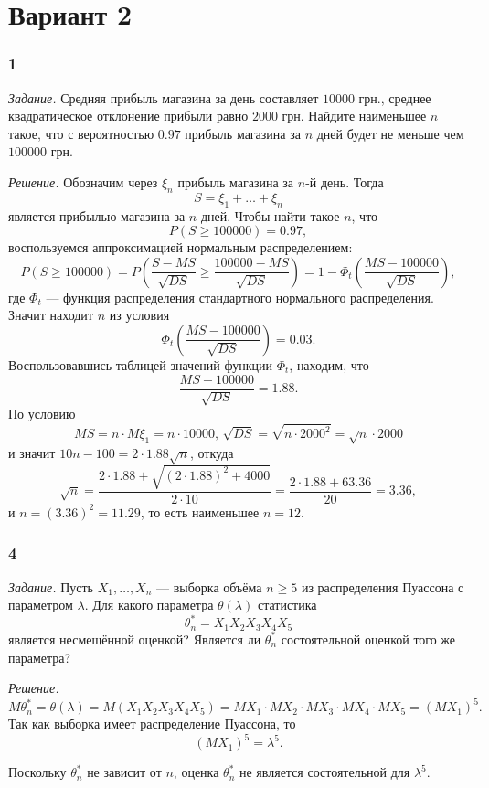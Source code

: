 \section*{Вариант 2}

\subsubsection*{1}

\textit{Задание.}
Средняя прибыль магазина за день составляет $10000$ грн.,
среднее квадратическое отклонение прибыли равно $2000$ грн.
Найдите наименьшее $n$ такое,
что с вероятностью $0.97$ прибыль магазина за $n$ дней будет не меньше чем $100000$ грн.

\textit{Решение.} Обозначим через $ \xi_n$ прибыль магазина за $n$-й день.
Тогда
$$S =
  \xi_1 + \dotsc + \xi_n$$
является прибылью магазина за $n$ дней.
Чтобы найти такое $n$, что
$$P \left( S \geq 100000 \right) =
  0.97,$$
воспользуемся аппроксимацией нормальным распределением:
$$P \left( S \geq 100000 \right) =
  P \left( \frac{S - MS}{ \sqrt{DS}} \geq \frac{100000 - MS}{ \sqrt{DS}} \right) =
  1 - \Phi_t \left( \frac{MS - 100000}{ \sqrt{DS}} \right),$$
где $ \Phi_t$ --- функция распределения стандартного нормального распределения.
Значит находит $n$ из условия
$$ \Phi_t \left( \frac{MS - 100000}{ \sqrt{DS}} \right) =
  0.03.$$
Воспользовавшись таблицей значений функции $ \Phi_t$, находим, что
$$ \frac{MS - 100000}{ \sqrt{DS}} =
  1.88.$$
По условию
$$MS = n \cdot M \xi_1 = n \cdot 10000, \,
  \sqrt{DS} = \sqrt{n \cdot 2000^2} = \sqrt{n} \cdot 2000$$
и значит $10n - 100 = 2 \cdot 1.88 \sqrt{n}$, откуда
$$ \sqrt{n} =
  \frac{2 \cdot 1.88 + \sqrt{ \left( 2 \cdot 1.88 \right)^2 + 4000}}{2 \cdot 10} =
  \frac{2 \cdot 1.88 + 63.36}{20} =
  3.36,$$
и $n = \left( 3.36 \right)^2 = 11.29$, то есть наименьшее $n = 12$.

\subsubsection*{4}

\textit{Задание.}
Пусть $X_1, \dotsc, X_n$ ---
выборка объёма $n \geq 5$ из распределения Пуассона с параметром $ \lambda $.
Для какого параметра $ \theta \left( \lambda \right) $ статистика
$$ \theta_n^* =
  X_1 X_2 X_3 X_4 X_5$$
является несмещённой оценкой?
Является ли $ \theta_n^*$ состоятельной оценкой того же параметра?

\textit{Решение.}
$$M \theta_n^* =
  \theta \left( \lambda \right) =
  M \left( X_1 X_2 X_3 X_4 X_5 \right) =
  MX_1 \cdot MX_2 \cdot MX_3 \cdot MX_4 \cdot MX_5 =
  \left( MX_1 \right)^5.$$
Так как выборка имеет распределение Пуассона, то
$$ \left( MX_1 \right)^5 =
  \lambda^5.$$

Поскольку $ \theta_n^*$ не зависит от $n$,
оценка $ \theta_n^*$ не является состоятельной для $ \lambda^5$.
